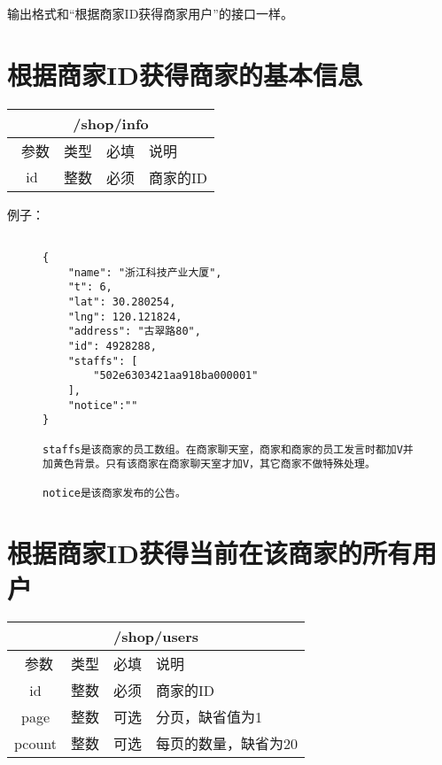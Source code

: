 \documentclass[cs4size]{ctexartutf8}
\begin{document}
输出格式和“根据商家ID获得商家用户”的接口一样。


\section{根据商家ID获得商家的基本信息}

\begin{table}[H]
   \begin{center}
\begin{tabular}{|c|c|c|p{12cm}|}
\hline
\multicolumn{4}{|c|}{/shop/info} \\
\hline\hline
 \  参数  & 类型 & 必填 &  说明  \\
\hline
 id  & 整数 & 必须 & 商家的ID\\
\hline
\end{tabular}
   \end{center}
\end{table}

例子：

\begin{figure}[H]
\begin{verbatim}

{
    "name": "浙江科技产业大厦",
    "t": 6,
    "lat": 30.280254,
    "lng": 120.121824,
    "address": "古翠路80",
    "id": 4928288,
    "staffs": [
        "502e6303421aa918ba000001"
    ],
    "notice":""
}

staffs是该商家的员工数组。在商家聊天室，商家和商家的员工发言时都加V并加黄色背景。只有该商家在商家聊天室才加V，其它商家不做特殊处理。

notice是该商家发布的公告。

\end{verbatim}
\end{figure}

\section{根据商家ID获得当前在该商家的所有用户}

\begin{table}[H]
   \begin{center}
\begin{tabular}{|c|c|c|p{12cm}|}
\hline
\multicolumn{4}{|c|}{/shop/users} \\
\hline\hline
 \  参数  & 类型 & 必填 &  说明  \\
\hline
 id  & 整数 & 必须 & 商家的ID\\
  \hline
 page  & 整数 & 可选 & 分页，缺省值为1\\ 
 \hline
 pcount  & 整数 & 可选 & 每页的数量，缺省为20\\ 
\hline
\end{tabular}
   \end{center}
\end{table}
\end{document}
